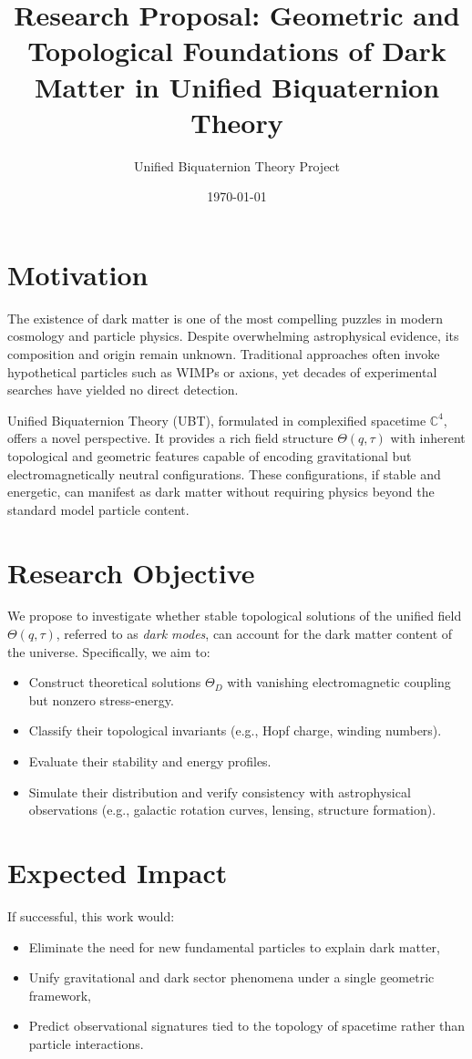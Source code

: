 \documentclass[12pt]{article}
\title{Research Proposal: Geometric and Topological Foundations of Dark Matter in Unified Biquaternion Theory}
\author{Unified Biquaternion Theory Project}
\date{\today}
\begin{document}
\maketitle


\SpeculativeContentWarning

\section*{Motivation}
The existence of dark matter is one of the most compelling puzzles in modern cosmology and particle physics. Despite overwhelming astrophysical evidence, its composition and origin remain unknown. Traditional approaches often invoke hypothetical particles such as WIMPs or axions, yet decades of experimental searches have yielded no direct detection.

Unified Biquaternion Theory (UBT), formulated in complexified spacetime \( \mathbb{C}^4 \), offers a novel perspective. It provides a rich field structure \( \Theta(q, \tau) \) with inherent topological and geometric features capable of encoding gravitational but electromagnetically neutral configurations. These configurations, if stable and energetic, can manifest as dark matter without requiring physics beyond the standard model particle content.

\section*{Research Objective}
We propose to investigate whether stable topological solutions of the unified field \( \Theta(q, \tau) \), referred to as \emph{dark modes}, can account for the dark matter content of the universe. Specifically, we aim to:

\begin{itemize}
  \item Construct theoretical solutions \( \Theta_D \) with vanishing electromagnetic coupling but nonzero stress-energy.
  \item Classify their topological invariants (e.g., Hopf charge, winding numbers).
  \item Evaluate their stability and energy profiles.
  \item Simulate their distribution and verify consistency with astrophysical observations (e.g., galactic rotation curves, lensing, structure formation).
\end{itemize}

\section*{Expected Impact}
If successful, this work would:
\begin{itemize}
  \item Eliminate the need for new fundamental particles to explain dark matter,
  \item Unify gravitational and dark sector phenomena under a single geometric framework,
  \item Predict observational signatures tied to the topology of spacetime rather than particle interactions.
\end{itemize}
\end{document}
